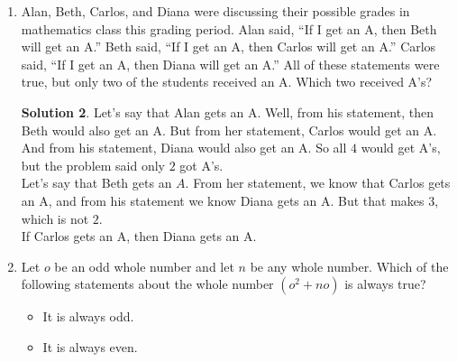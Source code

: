 \documentclass{article}
\theoremstyle{definition}
\newtheorem*{solution}{Solution}
\begin{document}
\begin{multicols*}{2}
\begin{enumerate}
\begin{center}
            \end{center}
            \begin{solution}
                To make the sum the greatest, put the three largest numbers $(13, 14, 15)$ in the corners.
                The balance the sides by putting the least integer $(10)$ between the greatest sum $(14 + 15)$.
                Then put the next lest integer $(11)$ between the next greatest sum $(13 + 15)$.
                Fill in the last integer $(12)$ and you can see that the sum of any three numbers on a side is (for example) $14 + 10 + 15 = 39$.
            \end{solution}
        \item Alan, Beth, Carlos, and Diana were discussing their possible grades in mathematics class this grading period.
            Alan said, ``If I get an A, then Beth will get an A.''
            Beth said, ``If I get an A, then Carlos will get an A.''
            Carlos said, ``If I get an A, then Diana will get an A.''
            All of these statements were true, but only two of the students received an A.
            Which two received A's?
            \begin{solution}
                Let's say that Alan gets an A. Well, from his statement, then Beth would also get an A.
                But from her statement, Carlos would get an A.
                And from his statement, Diana would also get an A.
                So all $4$ would get A's, but the problem said only $2$ got A's. \\
                Let's say that Beth gets an $A$.
                From her statement, we know that Carlos gets an A, and from his statement we know Diana gets an A.
                But that makes $3$, which is not $2$. \\
                If Carlos gets an A, then Diana gets an A.
            \end{solution}
        \item Let $o$ be an odd whole number and let $n$ be any whole number.
            Which of the following statements about the whole number $(o^2 + no)$ is always true?
            \begin{itemize}
                \item It is always odd.
                \item It is always even.

\end{itemize}
\end{enumerate}
\end{multicols*}
\end{document}
